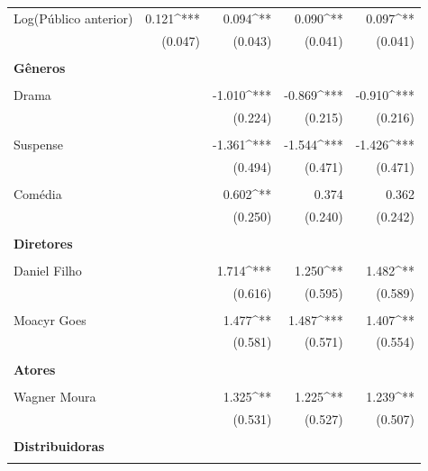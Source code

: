 \documentclass[11pt,a4paper]{article}
\begin{document}
\begin{table}[!htbp]
\begin{adjustbox}{width=0.88\textwidth}
\begin{tabular}{@{\extracolsep{5pt}}lD{.}{.}{-3} D{.}{.}{-3} D{.}{.}{-3} D{.}{.}{-3} }
  Log(Público anterior)  & 0.121^{***} & 0.094^{**} & 0.090^{**} & 0.097^{**} \\ 
  & (0.047) & (0.043) & (0.041) & (0.041) \\ 
  & & & & \\ 
  
  \textbf{Gêneros} & & & & \\ 
    & & & & \\   

  \quad Drama &  & -1.010^{***} & -0.869^{***} & -0.910^{***} \\ 
  &  & (0.224) & (0.215) & (0.216) \\ 
  & & & & \\ 
  
 \quad Suspense &  & -1.361^{***} & -1.544^{***} & -1.426^{***} \\ 
  &  & (0.494) & (0.471) & (0.471) \\ 
  & & & & \\ 
  
 \quad Comédia &  & 0.602^{**} & 0.374 & 0.362 \\ 
  &  & (0.250) & (0.240) & (0.242) \\ 
  & & & & \\ 
  

  \textbf{Diretores} & & & & \\ 
    & & & & \\ 
    
 \quad Daniel Filho  &  & 1.714^{***} & 1.250^{**} & 1.482^{**} \\ 
  &  & (0.616) & (0.595) & (0.589) \\ 
  & & & & \\
  
 \quad Moacyr Goes  &  & 1.477^{**} & 1.487^{***} & 1.407^{**} \\ 
  &  & (0.581) & (0.571) & (0.554) \\ 
  & & & & \\ 
  
  \textbf{Atores} & & & & \\ 
    & & & & \\   
  
  \quad Wagner Moura &  & 1.325^{**} & 1.225^{**} & 1.239^{**} \\ 
  &  & (0.531) & (0.527) & (0.507) \\ 
  & & & & \\ 
  
  
  \textbf{Distribuidoras} & & & & \\ 
    & & & & \\ 
  

\end{tabular}
\end{adjustbox}
\end{table}
\end{document}
